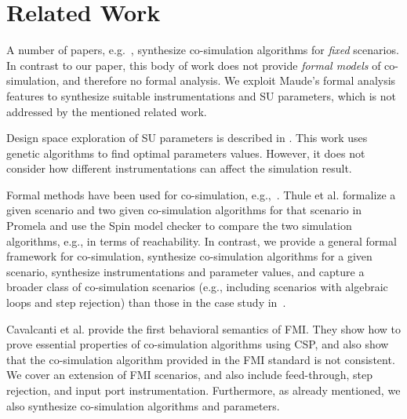 \section{Related Work}\label{sc:related}

A number of papers,
e.g.~\cite{Gomes2019c,Gomes2019a,Broman2013,thrane2021}, synthesize
co-simulation algorithms for \emph{fixed} scenarios. In contrast to
our paper,  this
body of work does not provide \emph{formal models} of co-simulation,
and therefore no formal analysis. We exploit Maude's formal analysis
features to
synthesize suitable instrumentations and SU parameters, which is not
addressed by the mentioned related work.  

Design space exploration of SU parameters  is described in \cite{dse,gamble_design_2014}.
This work uses genetic algorithms to find  optimal parameters values.
However, it does  not consider how different instrumentations can
affect the   simulation result.




Formal methods have  been used for  co-simulation, e.g.,~\cite{Thule_2018,Amalio2016,sampaio_behavioural_2016,cerone_formalising_2018,hansen_verification_2021}. 
%
Thule et al. \cite{Thule_2018} formalize a given scenario and two
given co-simulation algorithms for that scenario in {\sc Promela} and
use the {\sc Spin} model checker to compare the two simulation
algorithms, e.g., in terms of reachability.  In contrast, we provide a
general formal framework for co-simulation, synthesize co-simulation
algorithms for a given scenario, synthesize instrumentations and
parameter values, and capture a broader class of co-simulation
scenarios (e.g., including scenarios with algebraic loops and step
rejection) than those in the case study in~\cite{Thule_2018}. 


Cavalcanti et al. \cite{sampaio_behavioural_2016} provide the
first behavioral  semantics of FMI. 
They show how to prove essential properties of co-simulation algorithms using
CSP, and also show that the co-simulation algorithm provided in the
FMI standard is  not consistent. We cover an extension of FMI
scenarios, and also include feed-through, step rejection, and 
input port instrumentation. Furthermore, as already mentioned, we
also synthesize co-simulation algorithms and parameters. 


